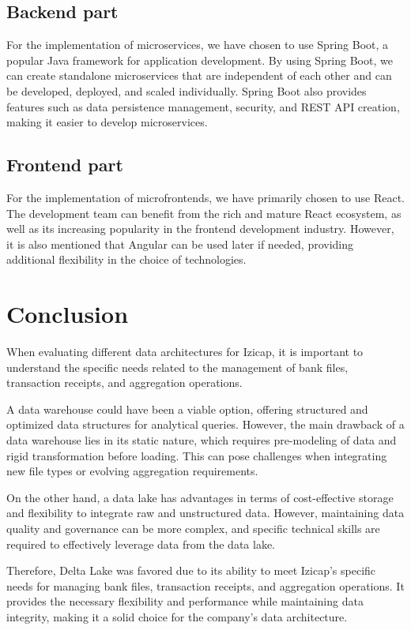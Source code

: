 \subsection{Backend part}
For the implementation of microservices, we have chosen to use Spring Boot, a popular Java framework for application development. By using Spring Boot, we can create standalone microservices that are independent of each other and can be developed, deployed, and scaled individually. Spring Boot also provides features such as data persistence management, security, and REST API creation, making it easier to develop microservices.

\subsection{Frontend part}
For the implementation of microfrontends, we have primarily chosen to use React. The development team can benefit from the rich and mature React ecosystem, as well as its increasing popularity in the frontend development industry. However, it is also mentioned that Angular can be used later if needed, providing additional flexibility in the choice of technologies.

\section*{Conclusion}
When evaluating different data architectures for Izicap, it is important to understand the specific needs related to the management of bank files, transaction receipts, and aggregation operations.

A data warehouse could have been a viable option, offering structured and optimized data structures for analytical queries. However, the main drawback of a data warehouse lies in its static nature, which requires pre-modeling of data and rigid transformation before loading. This can pose challenges when integrating new file types or evolving aggregation requirements.

On the other hand, a data lake has advantages in terms of cost-effective storage and flexibility to integrate raw and unstructured data. However, maintaining data quality and governance can be more complex, and specific technical skills are required to effectively leverage data from the data lake.

Therefore, Delta Lake was favored due to its ability to meet Izicap's specific needs for managing bank files, transaction receipts, and aggregation operations. It provides the necessary flexibility and performance while maintaining data integrity, making it a solid choice for the company's data architecture.

